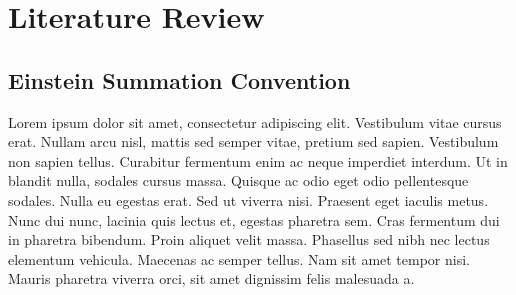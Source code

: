 \documentclass[natbib]{muthesis}
\begin{document}
  \chapter{Literature Review}

  \section{Einstein Summation Convention}
  Lorem ipsum dolor sit amet, consectetur adipiscing elit. Vestibulum vitae
  cursus erat. Nullam arcu nisl, mattis sed semper vitae, pretium sed sapien.
  Vestibulum non sapien tellus. Curabitur fermentum enim ac neque imperdiet
  interdum. Ut in blandit nulla, sodales cursus massa. Quisque ac odio eget
  odio pellentesque sodales. Nulla eu egestas erat. Sed ut viverra nisi.
  Praesent eget iaculis metus. Nunc dui nunc, lacinia quis lectus et, egestas
  pharetra sem. Cras fermentum dui in pharetra bibendum. Proin aliquet velit
  massa. Phasellus sed nibh nec lectus elementum vehicula. Maecenas ac semper
  tellus. Nam sit amet tempor nisi. Mauris pharetra viverra orci, sit amet
  dignissim felis malesuada a.

  

  \biography
\end{document}
